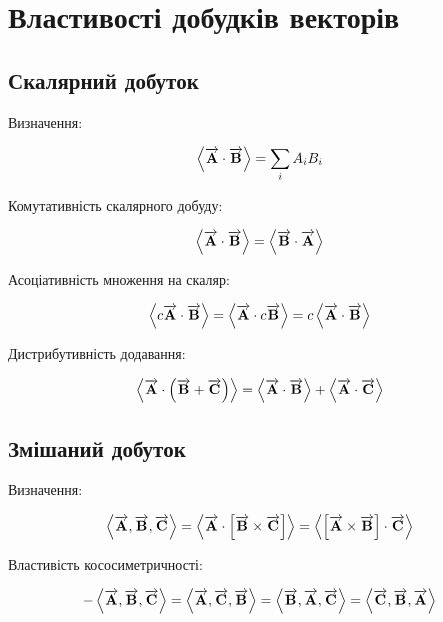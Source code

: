 \chapter{Властивості добудків векторів}
\label{ch:vector}

\section{Скалярний добуток}

Визначення:

\begin{equation*}
\dotprod{\vect{A}}{\vect{B}} = \sum_{i} A_i B_i
\end{equation*}

Комутативність скалярного добуду:

\begin{equation*}
\dotprod{\vect{A}}{\vect{B}} = \dotprod{\vect{B}}{\vect{A}}
\end{equation*}

Асоціативність множення на скаляр:

\begin{equation*}
\dotprod{c \vect{A}}{\vect{B}} = \dotprod{\vect{A}}{ c \vect{B}} =
c \dotprod{\vect{A}}{\vect{B}}
\end{equation*}

Дистрибутивність додавання:

\begin{equation*}
\dotprod{\vect{A}}{\left( \vect{B} + \vect{C} \right)} = 
\dotprod{\vect{A}}{\vect{B}} + \dotprod{\vect{A}}{\vect{C}} 
\end{equation*}

\section{Змішаний добуток}

Визначення:

\begin{equation*}
\triple{\vect{A}}{\vect{B}}{\vect{C}} = 
\dotprod{\vect{A}}{\crossprod{\vect{B}}{\vect{C}}} =
\dotprod{\crossprod{\vect{A}}{\vect{B}}}{\vect{C}}
\end{equation*}

Властивість кососиметричності:

\begin{equation*}
- \triple{\vect{A}}{\vect{B}}{\vect{C}} = 
\triple{\vect{A}}{\vect{C}}{\vect{B}} =
\triple{\vect{B}}{\vect{A}}{\vect{C}} = 
\triple{\vect{C}}{\vect{B}}{\vect{A}}
\end{equation*}

